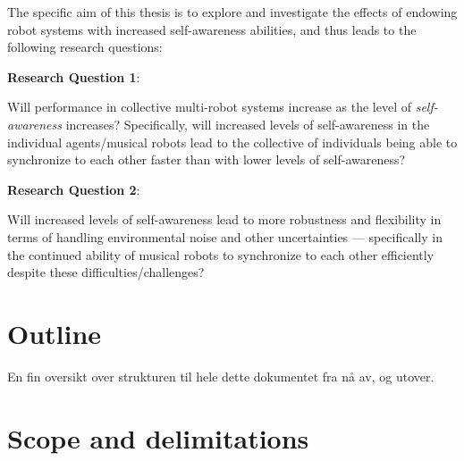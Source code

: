 

The specific aim of this thesis is to explore and investigate the effects of endowing robot systems with increased self-awareness abilities, and thus leads to the following research questions: \nl




\textbf{Research Question 1}:

Will performance in collective multi-robot systems increase as the level of \textit{self-awareness} increases? Specifically, will increased levels of self-awareness in the individual agents/musical robots lead to the collective of individuals being able to synchronize to each other faster than with lower levels of self-awareness? \nl

\textbf{Research Question 2}:

Will increased levels of self-awareness lead to more robustness and flexibility in terms of handling environmental noise and other uncertainties — specifically in the continued ability of musical robots to synchronize to each other efficiently despite these difficulties/challenges? \nl




\section{Outline}
En fin  oversikt over strukturen til hele dette dokumentet fra nå av, og utover.




\section{Scope and delimitations}







